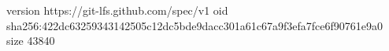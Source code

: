 version https://git-lfs.github.com/spec/v1
oid sha256:422dc63259343142505c12dc5bde9dacc301a61c67a9f3efa7fce6f90761e9a0
size 43840
